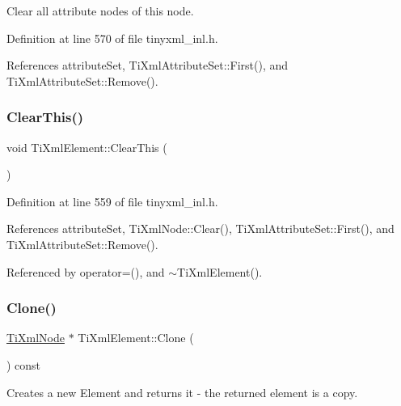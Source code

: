 Clear all attribute nodes of this node. 

Definition at line 570 of file tinyxml\+\_\+inl.\+h.



References attribute\+Set, Ti\+Xml\+Attribute\+Set\+::\+First(), and Ti\+Xml\+Attribute\+Set\+::\+Remove().

\hypertarget{class_ti_xml_element_a5670933ec2d7d9763b9891acc05d7f7d}{}\label{class_ti_xml_element_a5670933ec2d7d9763b9891acc05d7f7d} 
\subsubsection{\texorpdfstring{Clear\+This()}{ClearThis()}}
{\footnotesize\ttfamily void Ti\+Xml\+Element\+::\+Clear\+This (\begin{DoxyParamCaption}{ }\end{DoxyParamCaption})\hspace{0.3cm}{\ttfamily [protected]}}



Definition at line 559 of file tinyxml\+\_\+inl.\+h.



References attribute\+Set, Ti\+Xml\+Node\+::\+Clear(), Ti\+Xml\+Attribute\+Set\+::\+First(), and Ti\+Xml\+Attribute\+Set\+::\+Remove().



Referenced by operator=(), and $\sim$\+Ti\+Xml\+Element().

\hypertarget{class_ti_xml_element_a810ea8fa40844c01334e5af2a26794cb}{}\label{class_ti_xml_element_a810ea8fa40844c01334e5af2a26794cb} 
\subsubsection{\texorpdfstring{Clone()}{Clone()}}
{\footnotesize\ttfamily \hyperlink{class_ti_xml_node}{Ti\+Xml\+Node} $\ast$ Ti\+Xml\+Element\+::\+Clone (\begin{DoxyParamCaption}{ }\end{DoxyParamCaption}) const\hspace{0.3cm}{\ttfamily [virtual]}}



Creates a new Element and returns it -\/ the returned element is a copy. 



